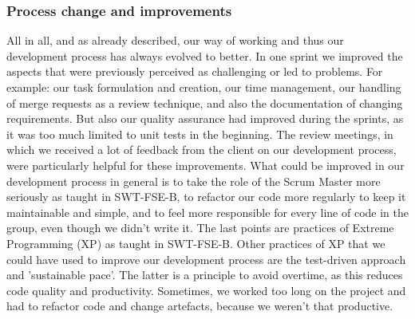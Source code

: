 \subsubsection{Process change and improvements}
All in all, and as already described, our way of working and thus our development process has always evolved to better.
In one sprint we improved the aspects that were previously perceived as challenging or led to problems.
For example: our task formulation and creation, our time management, our handling of merge requests as a review technique, and also the documentation of changing requirements.
But also our quality assurance had improved during the sprints, as it was too much limited to unit tests in the beginning.
The review meetings, in which we received a lot of feedback from the client on our development process, were particularly helpful for these improvements.
    What could be improved in our development process in general is to take the role of the Scrum Master more seriously as taught in SWT-FSE-B,
to refactor our code more regularly to keep it maintainable and simple, and to feel more responsible for every line of code in the group, even though we didn't write it.
The last points are practices of Extreme Programming (XP) as taught in SWT-FSE-B.
Other practices of XP that we could have used to improve our development process are the test-driven approach and 'sustainable pace'.
The latter is a principle to avoid overtime, as this reduces code quality and productivity.
Sometimes, we worked too long on the project and had to refactor code and change artefacts, because we weren't that productive.

